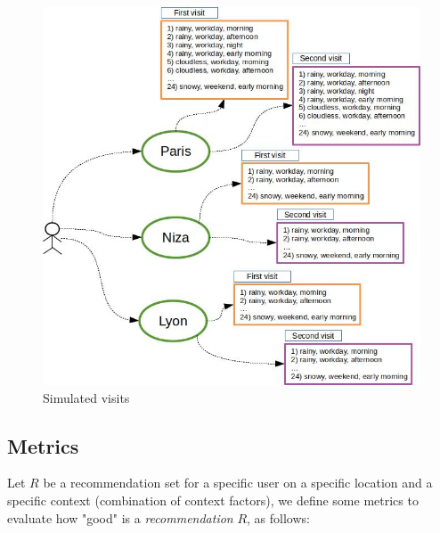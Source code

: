 \begin{figure}[h]
\vspace{-0.2cm}
\centering
\includegraphics[scale=0.4]{draws/experiments.jpg}
\vspace{-0.2cm}
\caption{Simulated visits}
\label{fig:experiments}
\vspace{-0.2cm}
\end{figure}

\vspace{-0.3cm}
\subsection{Metrics} \label{section:metrics}

Let $R$ be a recommendation set for a specific user on a specific location and a specific context (combination of context factors),
we define some metrics to evaluate how "good" is a \textit{recommendation} $R$, as follows:

